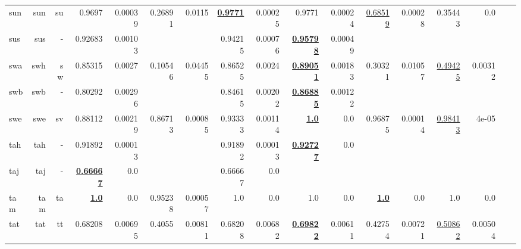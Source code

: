 \documentclass[11pt]{article}
\begin{document}
\begin{table*}[h]
{\begin{tabular}{lrrrrrrrrrrrrrrrr}
sun         & sun         & su         & 0.9697         & 0.00039         & 0.26891         & 0.0115         & \textbf{\underline{0.9771}}         & 0.00025         & 0.9771         & 0.00024         & \underline{0.68519}         & 0.00028         & 0.35443         & 0.0         \\
sus         & sus         & -         & 0.92683         & 0.00103         &          &          & 0.94215         & 0.00076         & \textbf{\underline{0.95798}}         & 0.00049         &          &          &          &          \\
swa         & swh         & sw         & 0.85315         & 0.0027         & 0.10546         & 0.04455         & 0.86525         & 0.0024         & \textbf{\underline{0.89051}}         & 0.00183         & 0.30321         & 0.01057         & \underline{0.49425}         & 0.00312         \\
swb         & swb         & -         & 0.80292         & 0.00296         &          &          & 0.84615         & 0.00202         & \textbf{\underline{0.86885}}         & 0.00122         &          &          &          &          \\
swe         & swe         & sv         & 0.88112         & 0.00219         & 0.86713         & 0.00085         & 0.93333         & 0.00114         & \textbf{\underline{1.0}}         & 0.0         & 0.96875         & 0.00014         & \underline{0.98413}         & 4e-05         \\
tah         & tah         & -         & 0.91892         & 0.00013         &          &          & 0.91892         & 0.00013         & \textbf{\underline{0.92727}}         & 0.0         &          &          &          &          \\
taj         & taj         & -         & \textbf{\underline{0.66667}}         & 0.0         &          &          & 0.66667         & 0.0         &          &          &          &          &          &          \\
tam         & tam         & ta         & \textbf{\underline{1.0}}         & 0.0         & 0.95238         & 0.00057         & 1.0         & 0.0         & 1.0         & 0.0         & \textbf{\underline{1.0}}         & 0.0         & 1.0         & 0.0         \\
tat         & tat         & tt         & 0.68208         & 0.00695         & 0.4055         & 0.00811         & 0.68208         & 0.00682         & \textbf{\underline{0.69822}}         & 0.00611         & 0.42754         & 0.00721         & \underline{0.50862}         & 0.00504         \\

\end{tabular}}
\end{table*}
\end{document}
